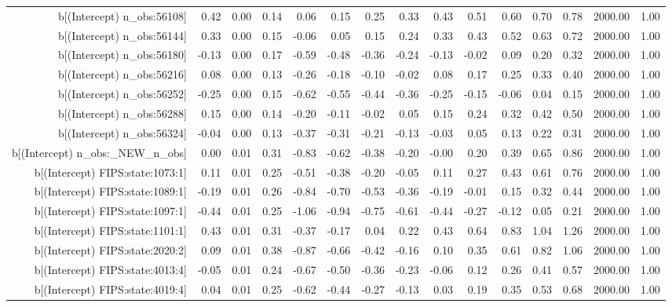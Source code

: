 \begin{table}[ht]
\begin{tabular}{rrrrrrrrrrrrrrr}
  b[(Intercept) n\_obs:56108] & 0.42 & 0.00 & 0.14 & 0.06 & 0.15 & 0.25 & 0.33 & 0.43 & 0.51 & 0.60 & 0.70 & 0.78 & 2000.00 & 1.00 \\ 
  b[(Intercept) n\_obs:56144] & 0.33 & 0.00 & 0.15 & -0.06 & 0.05 & 0.15 & 0.24 & 0.33 & 0.43 & 0.52 & 0.63 & 0.72 & 2000.00 & 1.00 \\ 
  b[(Intercept) n\_obs:56180] & -0.13 & 0.00 & 0.17 & -0.59 & -0.48 & -0.36 & -0.24 & -0.13 & -0.02 & 0.09 & 0.20 & 0.32 & 2000.00 & 1.00 \\ 
  b[(Intercept) n\_obs:56216] & 0.08 & 0.00 & 0.13 & -0.26 & -0.18 & -0.10 & -0.02 & 0.08 & 0.17 & 0.25 & 0.33 & 0.40 & 2000.00 & 1.00 \\ 
  b[(Intercept) n\_obs:56252] & -0.25 & 0.00 & 0.15 & -0.62 & -0.55 & -0.44 & -0.36 & -0.25 & -0.15 & -0.06 & 0.04 & 0.15 & 2000.00 & 1.00 \\ 
  b[(Intercept) n\_obs:56288] & 0.15 & 0.00 & 0.14 & -0.20 & -0.11 & -0.02 & 0.05 & 0.15 & 0.24 & 0.32 & 0.42 & 0.50 & 2000.00 & 1.00 \\ 
  b[(Intercept) n\_obs:56324] & -0.04 & 0.00 & 0.13 & -0.37 & -0.31 & -0.21 & -0.13 & -0.03 & 0.05 & 0.13 & 0.22 & 0.31 & 2000.00 & 1.00 \\ 
  b[(Intercept) n\_obs:\_NEW\_n\_obs] & 0.00 & 0.01 & 0.31 & -0.83 & -0.62 & -0.38 & -0.20 & -0.00 & 0.20 & 0.39 & 0.65 & 0.86 & 2000.00 & 1.00 \\ 
  b[(Intercept) FIPS:state:1073:1] & 0.11 & 0.01 & 0.25 & -0.51 & -0.38 & -0.20 & -0.05 & 0.11 & 0.27 & 0.43 & 0.61 & 0.76 & 2000.00 & 1.00 \\ 
  b[(Intercept) FIPS:state:1089:1] & -0.19 & 0.01 & 0.26 & -0.84 & -0.70 & -0.53 & -0.36 & -0.19 & -0.01 & 0.15 & 0.32 & 0.44 & 2000.00 & 1.00 \\ 
  b[(Intercept) FIPS:state:1097:1] & -0.44 & 0.01 & 0.25 & -1.06 & -0.94 & -0.75 & -0.61 & -0.44 & -0.27 & -0.12 & 0.05 & 0.21 & 2000.00 & 1.00 \\ 
  b[(Intercept) FIPS:state:1101:1] & 0.43 & 0.01 & 0.31 & -0.37 & -0.17 & 0.04 & 0.22 & 0.43 & 0.64 & 0.83 & 1.04 & 1.26 & 2000.00 & 1.00 \\ 
  b[(Intercept) FIPS:state:2020:2] & 0.09 & 0.01 & 0.38 & -0.87 & -0.66 & -0.42 & -0.16 & 0.10 & 0.35 & 0.61 & 0.82 & 1.06 & 2000.00 & 1.00 \\ 
  b[(Intercept) FIPS:state:4013:4] & -0.05 & 0.01 & 0.24 & -0.67 & -0.50 & -0.36 & -0.23 & -0.06 & 0.12 & 0.26 & 0.41 & 0.57 & 2000.00 & 1.00 \\ 
  b[(Intercept) FIPS:state:4019:4] & 0.04 & 0.01 & 0.25 & -0.62 & -0.44 & -0.27 & -0.13 & 0.03 & 0.19 & 0.35 & 0.53 & 0.68 & 2000.00 & 1.00 \\ 

\end{tabular}
\end{table}
